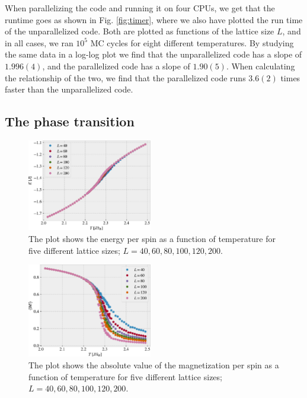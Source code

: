 \documentclass[%
 reprint,
nofootinbib,
aps,
]{revtex4-1}
\begin{document}
When parallelizing the code and running it on four CPUs, we get that the runtime goes as shown in Fig. \vref{fig:timer}, where we also have plotted the run time of the unparallelized code. Both are plotted as functions of the lattice size $L$, and in all cases, we ran $10^5$ MC cycles for eight different temperatures. By studying the same data in a log-log plot we find that the unparallelized code has a slope of $1.996(4)$, and the parallelized code has a slope of $1.90(5)$. When calculating the relationship of the two, we find that the parallelized code runs $3.6(2)$ times faster than the unparallelized code.

\subsection{The phase transition}

\begin{figure}
\includegraphics[width=0.485\textwidth]{../figures/energy.pdf}
\caption{The plot shows the energy per spin as a function of temperature for five different lattice sizes; $L = 40, 60, 80, 100, 120, 200$.}
\label{fig:energy}
\end{figure}

\begin{figure}
\includegraphics[width=0.485\textwidth]{../figures/magne.pdf}
\caption{The plot shows the absolute value of the magnetization per spin as a function of temperature for five different lattice sizes; $L = 40, 60, 80, 100, 120, 200$.}
\label{fig:magne}
\end{figure}
\end{document}
